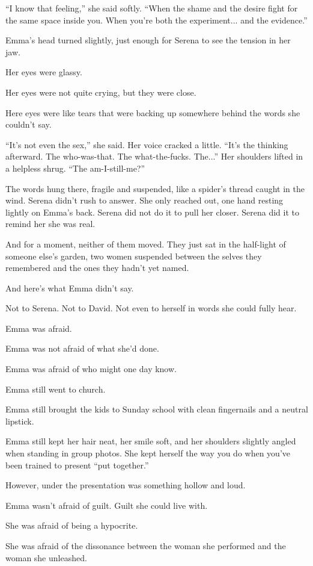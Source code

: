 ``I know that feeling,'' she said softly. ``When the shame and the desire fight for the same space inside 
you. When you’re both the experiment... and the evidence.''

Emma’s head turned slightly, just enough for Serena to see the tension in her jaw. 

Her eyes were glassy. 

Her eyes were not quite crying, but they were close. 

Here eyes were like tears that were backing up somewhere behind the words she couldn’t 
say. 

``It’s not even the sex,'' she said. Her voice cracked a little. ``It’s the thinking afterward. The 
who-was-that. The what-the-fucks. The...'' Her shoulders lifted in a helpless shrug. ``The am-I-still-me?''

The words hung there, fragile and suspended, like a spider’s thread caught in the wind. Serena didn’t 
rush to answer. She only reached out, one hand resting lightly on Emma’s back. Serena did not do it 
to pull her closer. Serena did it to remind her she was real.

And for a moment, neither of them moved. They just sat in the half-light of someone else’s garden, 
two women suspended between the selves they remembered and the ones they hadn’t yet named.

And here’s what Emma didn’t say.

Not to Serena.
Not to David.
Not even to herself in words she could fully hear.

Emma was afraid. 

Emma was not afraid of what she’d done.

Emma was afraid of who might one day know.

Emma still went to church.

Emma still brought the kids to Sunday school with clean fingernails and a neutral lipstick.

Emma still kept her hair neat, her smile soft, and her shoulders slightly angled when standing in group 
photos. She kept herself the way you do when you’ve been trained to present ``put together.''

However, under the presentation was something hollow and loud.

Emma wasn’t afraid of guilt. Guilt she could live with.

She was afraid of being a hypocrite.

She was afraid of the dissonance between the woman she performed and the woman she unleashed.


